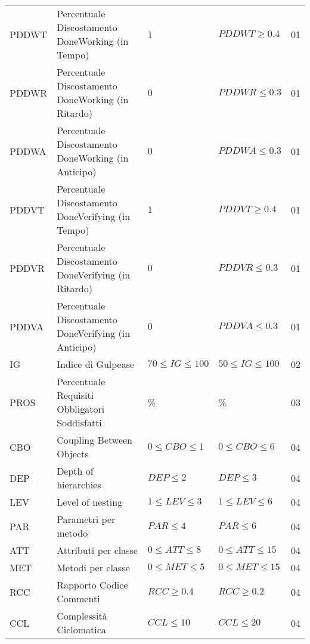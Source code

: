 \begin{longtable}{
		>{\centering}p{}
		>{}p{}
		>{\centering}p{}
		>{\centering}p{}
		>{}p{} }
	PDDWT & Percentuale Discostamento DoneWorking (in Tempo) & $1$ & $PDDWT \geq 0.4$ & 01 \\
	
	PDDWR & Percentuale Discostamento DoneWorking (in Ritardo) & $0$ & $PDDWR \leq 0.3$ & 01 \\
	
	PDDWA & Percentuale Discostamento DoneWorking (in Anticipo) & $0$ & $PDDWA \leq 0.3$ & 01 \\
	
	PDDVT & Percentuale Discostamento DoneVerifying (in Tempo) & $1$ & $PDDVT \geq 0.4$ & 01 \\
	
	PDDVR & Percentuale Discostamento DoneVerifying (in Ritardo) & $0$ & $PDDVR \leq 0.3$ & 01 \\
	
	PDDVA & Percentuale Discostamento DoneVerifying (in Anticipo) & $0$ & $PDDVA \leq 0.3$ & 01 \\
	
	IG & Indice di Gulpease & $70 \leq IG \leq 100$ & $50 \leq IG \leq 100$ & 02 \\
	
	PROS & Percentuale Requisiti Obbligatori Soddisfatti & 100\% & 100\% & 03 \\
	
	CBO & Coupling Between Objects & $0\leq CBO \leq 1$ & $0\leq CBO \leq 6$ & 04 \\
	
	DEP & Depth of hierarchies & $DEP \leq 2$ & $DEP \leq 3$ & 04 \\
	
	LEV & Level of nesting & $1\leq LEV \leq 3$ & $1\leq LEV \leq 6$ & 04 \\
	
	PAR & Parametri per metodo & $PAR \leq 4$ & $PAR \leq 6$ & 04 \\
	
	ATT & Attributi per classe & $0 \leq ATT \leq 8$ & $0 \leq ATT \leq 15$ & 04 \\
	
	MET & Metodi per classe & $0 \leq MET \leq 5$ & $0 \leq MET \leq 15$ & 04 \\
	
	RCC & Rapporto Codice Commenti & $RCC \geq 0.4$ & $RCC \geq 0.2$  & 04 \\
	
	CCL & Complessità Ciclomatica & $CCL \leq 10 $ & $CCL \leq 20 $& 04 \\
	

\end{longtable}
